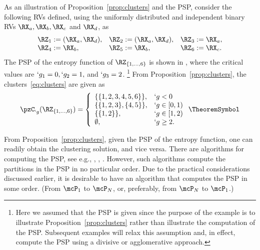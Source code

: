 \begin{example}
	\label{eg:psp}
	As an illustration of Proposition~\ref{prop:clusters} and the PSP, consider the following RVs
	defined, using the uniformly distributed and independent binary RVs $\RX_a, \RX_b, \RX_c$ and
	$\RX_d$, as
	\begin{align}
		\label{eq:eg-motivate}
		\begin{array}{lll}
			\RZ_1:=(\RX_a,\RX_d), &\RZ_2:=(\RX_a,\RX_d), &\RZ_3:=\RX_a, 
			\\
			\RZ_4:=\RX_b, &\RZ_5:=\RX_b, &\RZ_6:=\RX_c. 
		\end{array}
	\end{align}
	The PSP of the entropy function of $\RZ_{\{1,\dots,6\}}$ is shown in , where the critical values are 
	$	`g_1 = 0, `g_2 = 1,$ and $`g_3 = 2$.%
	\footnote{Here we assumed that the PSP is given since the purpose of the example is to illustrate
		Proposition~\ref{prop:clusters} rather than illustrate the computation of the PSP. Subsequent examples
	will relax this assumption and, in effect, compute the PSP using a  divisive or agglomerative
	approach.}
	From Proposition~\ref{prop:clusters}, the clusters~\eqref{eq:clusters} are given as
	\begin{align}
		\label{eq:eg-clusters}
		\pzC_{`g}(\RZ_{\{1,\ldots,6\}}) = \left\{
			\begin{array}{ll}
				\{\{1,2,3,4,5,6\}\}, 		& `g < 0 \\
				\{\{1,2,3\},\{4,5\}\}, 	& `g \in [0,1) \\
				\{\{1,2\}\},			 	& `g \in [1,2) \\
				\emptyset,				 	& `g \geq 2.
			\end{array}
			\right.\TheoremSymbol
	\end{align}
\end{example}

From Proposition~\ref{prop:clusters}, given the PSP of the entropy function, one can readily obtain the clustering
solution, and vice versa.
There are algorithms for computing the PSP, see e.g.,
\cite[Algorithm~3]{chan16cluster}, \cite[Ch.~13]{narayanan:book}, \cite{nagano10}. However, such algorithms
compute the partitions in the PSP in no particular order. Due to the practical considerations
discussed earlier, it is desirable to have an algorithm that computes the PSP in some order. 
(From $\mcP_1$ to $\mcP_N$, or, preferably, from $\mcP_{N}$ to $\mcP_{1}$.) 



